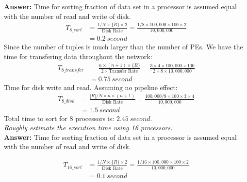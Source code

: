 \documentclass[a4paper,12pt]{article}
\begin{document}
\vspace{1.5em}
\noindent
\textbf{Answer:} 
\noindent
Time for sorting fraction of data set in a processor is assumed equal with the number of read and write of disk.
\begin{equation*}
	\begin{aligned}
		T_{8\_sort} & = \frac{1/N \times \{R\} \times 2}{\mbox{Disk Rate}}
		 = \frac{1/8 \times 100,000 \times 100 \times 2}{10,000,000} \\
		& = 0.2\ second
	\end{aligned}
\end{equation*}
\noindent
Since the number of tuples is much larger than the number of PEs. We have the time for transfering data throughout the network:
\begin{equation*}
	\begin{aligned}
		T_{8\_transfer} & = \frac{n \times (n+1) \times \{R\}}{2 \times \mbox{Transfer Rate}}
		 = \frac{3 \times 4 \times 100,000 \times 100}{2 \times 8 \times 10,000,000} \\
		& = 0.75\ second
	\end{aligned}
\end{equation*}
Time for disk write and read. Assuming no pipeline effect:
\begin{equation*}
	\begin{aligned}
		 T_{8\_disk} & = \frac{|R| / N \times n \times (n + 1)}{\mbox{Disk Rate}}
					  = \frac{100,000 / 8 \times 100 \times 3 \times 4}{10,000,000} \\
					 & = 1.5\ second
	\end{aligned}
\end{equation*}
Total time to sort for 8 processors is: $2.45\ second$. \\

\textit{Roughly estimate the execution time using 16 processors.} \\

\noindent
\textbf{Answer:} 
\noindent
Time for sorting fraction of data set in a processor is assumed equal with the number of read and write of disk.

\begin{equation*}
	\begin{aligned}
		T_{16\_sort} & = \frac{1/N \times \{R\} \times 2}{\mbox{Disk Rate}}
		 = \frac{1/16 \times 100,000 \times 100 \times 2}{10,000,000} \\
		& = 0.1\ second
	\end{aligned}
\end{equation*}
\end{document}
